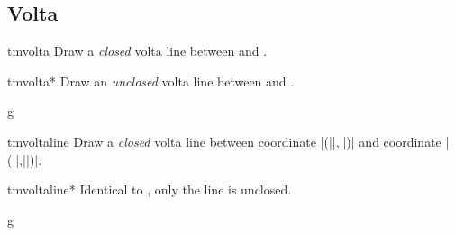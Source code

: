 \documentclass[11pt,a4paper]{ltxdoc}
\begin{document}
\subsection{Volta}\label{sec:line:volta}
\begin{docCommand}{tmvolta}{}
  Draw a \emph{closed} volta line between  and .
\end{docCommand}
\begin{docCommand}{tmvolta*}{}
  Draw an \emph{unclosed} volta line between  and .
\end{docCommand}
\begin{dispExample}
\begin{tmsinglestaff}
  \begin{tmstaff}{g}
  \end{tmstaff}
\end{tmsinglestaff}
\end{dispExample}
\begin{docCommand}{tmvoltaline}{}
  Draw a \emph{closed} volta line between coordinate 
  |(||,||)| and coordinate 
  |(||,||)|.
\end{docCommand}
\begin{docCommand}{tmvoltaline*}{}
  Identical to , only the line is unclosed.
\end{docCommand}
\begin{dispExample}
\begin{tmsinglestaff}
  \begin{tmstaff}{g}
  \end{tmstaff}
\end{tmsinglestaff}
\end{dispExample}
\end{document}
